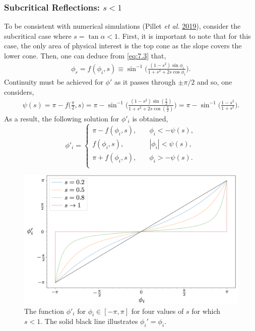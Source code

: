 \documentclass[a4paper]{article}
\numberwithin{equation}{section}
\begin{document}
\subsubsection{Subcritical Reflections: $s < 1$}
To be consistent with numerical simulations (Pillet \emph{et al.} \hyperlink{ref 37}{2019}), consider the subcritical case where $s = \tan\alpha < 1$. First, it is important to note that for this case, the only area of physical interest is the top cone as the slope covers the lower cone. Then, one can deduce from \eqref{eq:7.3} that,
\begin{align*}
\phi_r = f(\phi_i, s) \equiv \sin^{-1} \bigg( \frac{(1-s^2)\sin\phi_i}{1 + s^2 + 2s\cos\phi_i} \bigg).
\end{align*}
Continuity must be achieved for $\phi'$ as it passes through $\pm \pi/2$ and so, one considers,
\begin{align*}
\psi(s) = \pi - f\big(\frac{\pi}{2}, s\big) = \pi - \sin^{-1}\bigg(\frac{(1- s^2)\sin(\frac{\pi}{2})}{1+s^2 + 2s\cos(\frac{\pi}{2})}\bigg) = \pi - \sin^{-1}\bigg(\frac{1- s^2}{1+s^2}\bigg).
\end{align*}
As a result, the following solution for $\phi'_i$ is obtained,
\begin{equation*}
\phi'_i = \left\{
        \begin{array}{ll}
            \pi - f(\phi_i, s), & \quad \phi_i < -\psi(s), \\
            f(\phi_i, s), & \quad  |\phi_i| < \psi(s), \\
            \pi + f(\phi_i, s), & \quad  \phi_i > -\psi(s). \\
        \end{array}
    \right.
\end{equation*}
\begin{figure}[h!]
  \includegraphics[scale=0.3, center]{Images/trapping plot.png}
  \caption{The function $\phi'_i$ for $\phi_i \in [-\pi, \pi]$ for four values of $s$ for which $s < 1$. The solid black line illustrates $\phi_i' = \phi_i$.}
  \label{fig:16}
\end{figure} \\
\end{document}
